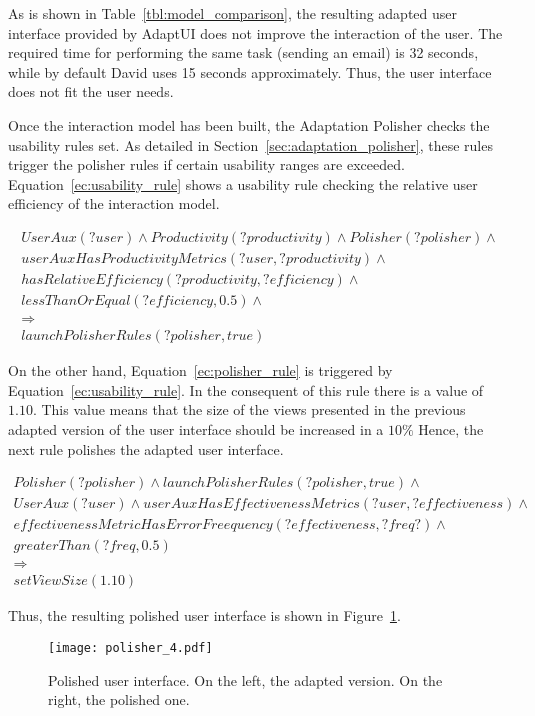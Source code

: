 As is shown in Table~\ref{tbl:model_comparison}, the resulting adapted user 
interface provided by AdaptUI does not improve the interaction of the user.
The required time for performing the same task (sending an email) is 32 seconds,
while by default David uses 15 seconds approximately. Thus, the user interface
does not fit the user needs. 

Once the interaction model has been built, the Adaptation Polisher checks the
usability rules set. As detailed in Section~\ref{sec:adaptation_polisher}, these
rules trigger the polisher rules if certain usability ranges are exceeded.
Equation~\ref{ec:usability_rule} shows a usability rule checking the relative
user efficiency of the interaction model.

\footnotesize
\begin{equation} \label{ec:usability_rule}
  \begin{align*} 
  UserAux(?user) ∧ Productivity(?productivity) ∧ Polisher(?polisher) ∧\\ 
  userAuxHasProductivityMetrics(?user, ?productivity) ∧ \\
  hasRelativeEfficiency(?productivity, ?efficiency) ∧ \\
  lessThanOrEqual(?efficiency, 0.5) ∧ \\
  \Rightarrow \\
  launchPolisherRules(?polisher, true)
  \end{align*}
\end{equation}
\normalsize

On the other hand, Equation~\ref{ec:polisher_rule} is triggered by 
Equation~\ref{ec:usability_rule}. In the consequent of this rule there is 
a value of $1.10$. This value means that the size of the views presented in the
previous adapted version of the user interface should be increased in a $10\%$
Hence, the next rule polishes the adapted user
interface.

\footnotesize
\begin{equation} \label{ec:polisher_rule}
  \begin{align*} 
  Polisher(?polisher) ∧ launchPolisherRules(?polisher, true) ∧\\
  UserAux(?user) ∧ userAuxHasEffectivenessMetrics(?user, ?effectiveness) ∧ \\
  effectivenessMetricHasErrorFreequency(?effectiveness, ?freq?) ∧\\
  greaterThan(?freq, 0.5)\\
  \Rightarrow \\
  setViewSize(1.10)
  \end{align*}
\end{equation}
\normalsize

Thus, the resulting polished user interface is shown in Figure~\ref{fig:polisher_4}.

\begin{figure}
\centering
\texttt{[image: polisher\_4.pdf]}
\caption{Polished user interface. On the left, the adapted version. On the 
right, the polished one.}
\label{fig:polisher_4}
\end{figure}